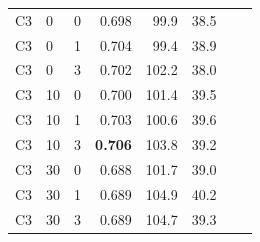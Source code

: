 \documentclass[pdflatex,sn-mathphys-num]{sn-jnl}%
\theoremstyle{thmstyleone}%
\theoremstyle{thmstyletwo}%
\theoremstyle{thmstylethree}%
\begin{document}
\begin{appendices}
\begin{table}[htbp]
\begin{tabular}{llrrrrrr}
\addlinespace[4pt]
C3 & 0 & 0 & 0.698 & 99.9 & 38.5 \\
C3 & 0 & 1 & 0.704 & 99.4 & 38.9 \\
C3 & 0 & 3 & 0.702 & 102.2 & 38.0 \\
C3 & 10 & 0 & 0.700 & 101.4 & 39.5 \\
C3 & 10 & 1 & 0.703 & 100.6 & 39.6 \\
C3 & 10 & 3 & \textbf{0.706} & 103.8 & 39.2 \\
C3 & 30 & 0 & 0.688 & 101.7 & 39.0 \\
C3 & 30 & 1 & 0.689 & 104.9 & 40.2 \\
C3 & 30 & 3 & 0.689 & 104.7 & 39.3 \\
\bottomrule
\end{tabular}
\end{table}


\end{appendices}
\end{document}
